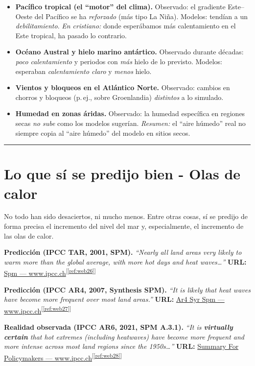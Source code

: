 \documentclass[
  10pt,
  a4paper,
  DIV=11,
  numbers=noendperiod,
  open=any]{scrreprt}
\numberwithin{equation}{chapter}
\numberwithin{equation}{section}
\renewcommand{\[}{\begin{equation}}
\renewcommand{\]}{\end{equation}}
\newcommand{\refweb}[3]{%
  \href{#1}{#2}\textsuperscript{[\ref{ref:#3}]}%
}
\begin{document}
\begin{itemize}
  \item \textbf{Pacífico tropical (el “motor” del clima).} 
  Observado: el gradiente Este–Oeste del Pacífico se ha \emph{reforzado} (más tipo La Niña). 
  Modelos: tendían a un \emph{debilitamiento}. 
  \emph{En cristiano:} donde esperábamos más calentamiento en el Este tropical, ha pasado lo contrario.
  \item \textbf{Océano Austral y hielo marino antártico.}
  Observado durante décadas: \emph{poco calentamiento} y periodos con \emph{más} hielo de lo previsto. 
  Modelos: esperaban \emph{calentamiento claro} y \emph{menos} hielo.
  \item \textbf{Vientos y bloqueos en el Atlántico Norte.}
  Observado: cambios en chorros y bloqueos (p.\,ej., sobre Groenlandia) \emph{distintos} a lo simulado. 
  \item \textbf{Humedad en zonas áridas.}
  Observado: la humedad específica en regiones secas \emph{no sube} como los modelos sugerían. 
  \emph{Resumen:} el “aire húmedo” real no siempre copia al “aire húmedo” del modelo en sitios secos.
\end{itemize}

\begin{center}\rule{0.5\linewidth}{0.5pt}\end{center}

\section{Lo que sí se predijo bien - Olas de calor}

No todo han sido desaciertos, ni mucho menos. Entre otras cosas, sí se predijo de forma precisa el incremento del nivel del mar y, especialmente, el incremento de las olas de calor. 

\textbf{Predicción (IPCC TAR, 2001, SPM).} \emph{“Nearly all land areas very likely to warm more than the global average, with more hot days and heat waves…”} 
\textbf{URL:} \refweb{https://www.ipcc.ch/site/assets/uploads/2018/03/spm.pdf}{Spm — www.ipcc.ch}{web26}

\textbf{Predicción (IPCC AR4, 2007, Synthesis SPM).} \emph{“It is likely that heat waves have become more frequent over most land areas.”}
\textbf{URL:} \refweb{https://www.ipcc.ch/pdf/assessment-report/ar4/syr/ar4_syr_spm.pdf}{Ar4 Syr Spm — www.ipcc.ch}{web27}

\textbf{Realidad observada (IPCC AR6, 2021, SPM A.3.1).} \emph{“It is \textbf{virtually certain} that hot extremes (including heatwaves) have become more frequent and more intense across most land regions since the 1950s…”}
\textbf{URL:} \refweb{https://www.ipcc.ch/report/ar6/wg1/chapter/summary-for-policymakers/}{Summary For Policymakers — www.ipcc.ch}{web28}
\end{document}
